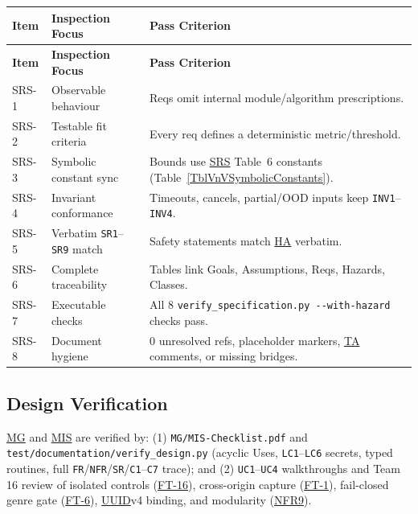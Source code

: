 \documentclass[12pt, titlepage]{article}
\newcommand{\HA}{\hyperlink{vnv-acr-ha}{HA}}
\newcommand{\MG}{\hyperlink{vnv-acr-mg}{MG}}
\newcommand{\MIS}{\hyperlink{vnv-acr-mis}{MIS}}
\newcommand{\SRS}{\hyperlink{vnv-acr-srs}{SRS}}
\newcommand{\TA}{\hyperlink{vnv-acr-ta}{TA}}
\newcommand{\UUID}{\hyperlink{vnv-acr-uuid}{UUID}}
\begin{document}
\begingroup\small
\renewcommand{\arraystretch}{0.95}
\setlength{\tabcolsep}{4pt}
\begin{tabularx}{\textwidth}{P{1.1cm} P{3.6cm} Y}
\caption[SRS Verification Checklist]{SRS Verification Checklist (Eight Mandatory Review Criteria)} \label{TblSRSVerifChecklist}\\
\toprule
\textbf{Item} & \textbf{Inspection Focus} & \textbf{Pass Criterion}\\
\midrule
\endfirsthead
\toprule
\textbf{Item} & \textbf{Inspection Focus} & \textbf{Pass Criterion}\\
\midrule
\endhead
\bottomrule
\endfoot
SRS-1 & Observable behaviour & Reqs omit internal module/algorithm prescriptions.\\
SRS-2 & Testable fit criteria & Every req defines a deterministic metric/threshold.\\
SRS-3 & Symbolic constant sync & Bounds use \SRS{} Table~6 constants (Table~\ref{TblVnVSymbolicConstants}).\\
SRS-4 & Invariant conformance & Timeouts, cancels, partial/OOD inputs keep \texttt{INV1}--\texttt{INV4}.\\
SRS-5 & Verbatim \texttt{SR1}--\texttt{SR9} match & Safety statements match \HA{} verbatim.\\
SRS-6 & Complete traceability & Tables link Goals, Assumptions, Reqs, Hazards, Classes.\\
SRS-7 & Executable checks & All 8 \texttt{verify\_\allowbreak{}specification.py -{}-with-hazard} checks pass.\\
SRS-8 & Document hygiene & 0 unresolved refs, placeholder markers, \TA{} comments, or missing bridges.\\
\end{tabularx}
\endgroup

\subsection{Design Verification}\label{subsec:design-verif}

\MG{} \cite{VerityMG2026} and \MIS{} \cite{VerityMIS2026} are verified by: (1) \texttt{MG/\allowbreak{}MIS-\allowbreak{}Checklist.pdf} \cite{SmithCapTemplate} and \texttt{test/\allowbreak{}documentation/\allowbreak{}verify\_\allowbreak{}design.py} (acyclic Uses, \texttt{LC1}--\texttt{LC6} secrets, typed routines, full \texttt{FR}/\texttt{NFR}/\texttt{SR}/\texttt{C1}--\texttt{C7} trace); and (2) \texttt{UC1}--\texttt{UC4} walkthroughs and Team 16 review of isolated controls (\hyperref[test:FT-16]{FT-16}), cross-origin capture (\hyperref[test:FT-1]{FT-1}), fail-closed genre gate (\hyperref[test:FT-6]{FT-6}), \UUID{}v4 binding, and modularity (\hyperref[req:NFR9]{NFR9}).
\end{document}
